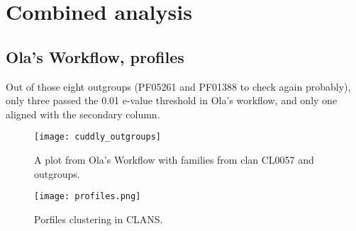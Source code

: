          \section{Combined analysis}

      \subsection{Ola's Workflow, profiles}
Out of those eight outgroups (PF05261 and PF01388 to check again probably), only three passed the 0.01 e-value threshold in Ola's workflow, and only one aligned with the secondary column.

\begin{figure}[H]
\texttt{[image: cuddly\_outgroups]}
\caption{A plot from Ola's Workflow with families from clan CL0057 and outgroups.}
\end{figure}

\begin{figure}[H]
\texttt{[image: profiles.png]}
\caption{Porfiles clustering in CLANS.}
\end{figure}